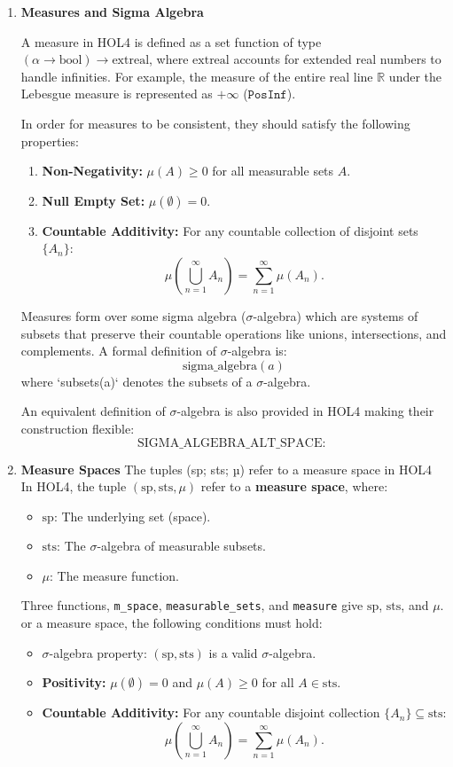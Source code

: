 \begin{enumerate}
    \item \textbf{Measures and Sigma Algebra}

    A measure in HOL4 is defined as a set function of type \((\alpha \to \text{bool}) \to \text{extreal}\), where \(\text{extreal}\) accounts for extended real numbers to handle infinities. For example, the measure of the entire real line \(\mathbb{R}\) under the Lebesgue measure is represented as \(+\infty\) (\(\texttt{PosInf}\)).

    In order for measures to be consistent, they should satisfy the following properties:
    \begin{enumerate}
        \item \textbf{Non-Negativity:} \(\mu(A) \geq 0\) for all measurable sets \(A\).
        \item \textbf{Null Empty Set:} \(\mu(\emptyset) = 0\).
        \item \textbf{Countable Additivity:} For any countable collection of disjoint sets \(\{A_n\}\):
   \[
   \mu\left(\bigcup_{n=1}^\infty A_n\right) = \sum_{n=1}^\infty \mu(A_n).
   \]
    \end{enumerate}
    Measures form over some sigma algebra (\(\sigma\)-algebra) which are systems of subsets that preserve their countable operations like unions, intersections, and complements. A formal definition of \(\sigma\)-algebra is:
\[
\text{sigma\_algebra}(a)
\]
where `subsets(a)` denotes the subsets of a \(\sigma\)-algebra.

An equivalent definition of \(\sigma\)-algebra is also provided in HOL4 making their construction flexible:
\[
\text{SIGMA\_ALGEBRA\_ALT\_SPACE}:\
\]

    \item \textbf{Measure Spaces}
The tuples (sp; sts; µ) refer to a measure space in HOL4
In HOL4, the tuple \((\text{sp}, \text{sts}, \mu)\) refer to a \textbf{measure space}, where:
\begin{itemize}
    \item \(\text{sp}\): The underlying set (space).
    \item \(\text{sts}\): The \(\sigma\)-algebra of measurable subsets.
    \item \(\mu\): The measure function.
\end{itemize}

Three functions, \texttt{m\_space}, \texttt{measurable\_sets}, and \texttt{measure} give \(\text{sp}\), \(\text{sts}\), and \(\mu\). or a measure space, the following conditions must hold:
\begin{itemize}
    \item \(\sigma\)-algebra property: \((\text{sp}, \text{sts})\) is a valid \(\sigma\)-algebra.
    \item \textbf{Positivity:} \( \mu(\emptyset) = 0 \) and \( \mu(A) \geq 0 \) for all \( A \in \text{sts} \).
    \item \textbf{Countable Additivity:} For any countable disjoint collection \( \{A_n\} \subseteq \text{sts} \):
   \[
   \mu\left(\bigcup_{n=1}^\infty A_n\right) = \sum_{n=1}^\infty \mu(A_n).
   \]
\end{itemize}


\end{enumerate}
